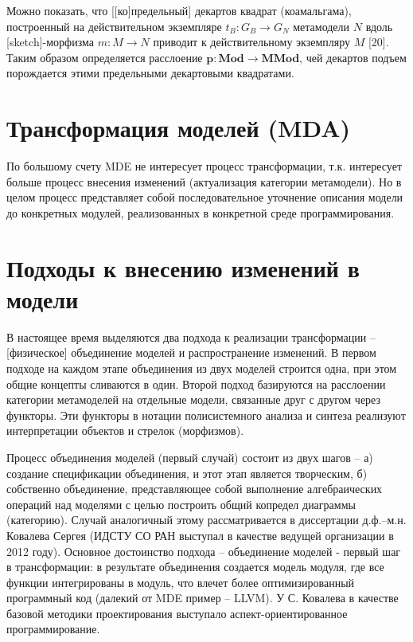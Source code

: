 \documentclass[12pt,a4paper]{extarticle}
\begin{document}
Можно показать, что [[ко]предельный] декартов квадрат (коамальгама), построенный
на действительном экземпляре $t_B: G_B\to G_N$ метамодели $N$ вдоль
[sketch]-морфизма $m:M\to N$ приводит к действительному экземпляру $M$ [20].
Таким образом определяется расслоение $\mathbf{p} : \mathbf{Mod} \to
\mathbf{MMod}$, чей декартов подъем порождается этими предельными декартовыми квадратами.

\section{Трансформация моделей (MDA)}
\label{sec:mda-transform}

По большому счету MDE не интересует процесс трансформации, т.к. интересует
больше процесс внесения изменений (актуализация категории метамодели).  Но в
целом процесс представляет собой последовательное уточнение описания модели до
конкретных модулей, реализованных в конкретной среде программирования.

\section{Подходы к внесению изменений в модели}
\label{sec:mde-conversions}

В настоящее время выделяются два подхода к реализации трансформации --
[физическое] объединение моделей и распространение изменений.  В первом подходе
на каждом этапе объединения из двух моделей строится одна, при этом общие
концепты сливаются в один.  Второй подход базируются на расслоении категории
метамоделей на отдельные модели, связанные друг с другом через функторы.  Эти
функторы в нотации полисистемного анализа и синтеза реализуют интерпретации
объектов и стрелок (морфизмов).

Процесс объединения моделей (первый случай) состоит из двух шагов -- а) создание
спецификации объединения, и этот этап является творческим, б) собственно
объединение, представляющее собой выполнение алгебраических операций над
моделями с целью построить общий копредел диаграммы (категорию).  Случай
аналогичный этому рассматривается в диссертации д.ф.--м.н. Ковалева Сергея
(ИДСТУ СО РАН выступал в качестве ведущей организации в 2012 году).  Основное
достоинство подхода -- объединение моделей - первый шаг в трансформации: в
результате объединения создается модель модуля, где все функции интегрированы в
модуль, что влечет более оптимизированный программный код (далекий от MDE пример
-- LLVM).  У С. Ковалева в качестве базовой методики проектирования выступало
аспект-ориентированное программирование.
\end{document}
